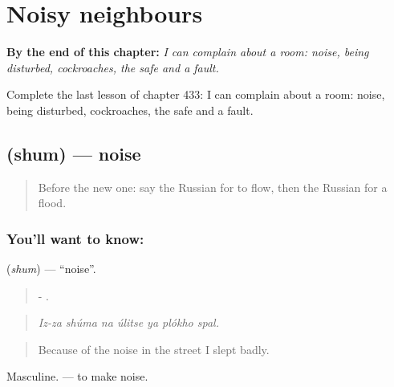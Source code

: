 
\chapter{Noisy neighbours}
\label{ch:ru-noisy-neighbours}

\begin{chapteropening}
\textbf{By the end of this chapter:} \emph{I can complain about a room: noise, being disturbed, cockroaches, the safe and a fault.}

Complete the last lesson of chapter 433: I can complain about a room: noise, being disturbed, cockroaches, the safe and a fault.
\end{chapteropening}

\section[\texorpdfstring{\ru{шум} (shum)}{шум (shum)}]{ (shum) — noise}

\label{lesson:RU-C433-shum}



\begin{quote}
Before the new one: say the Russian for to flow, then the Russian for a flood.
\end{quote}

\subsection*{You'll want to know: }
\textbf{} (\emph{shum}) — \textquotedblleft{}noise\textquotedblright{}.

\begin{quote}
-      .
\end{quote}

\begin{quote}
\emph{Iz-za shúma na úlitse ya plókho spal.}
\end{quote}

\begin{quote}
Because of the noise in the street I slept badly.
\end{quote}

Masculine. \emph{} — to make noise.

